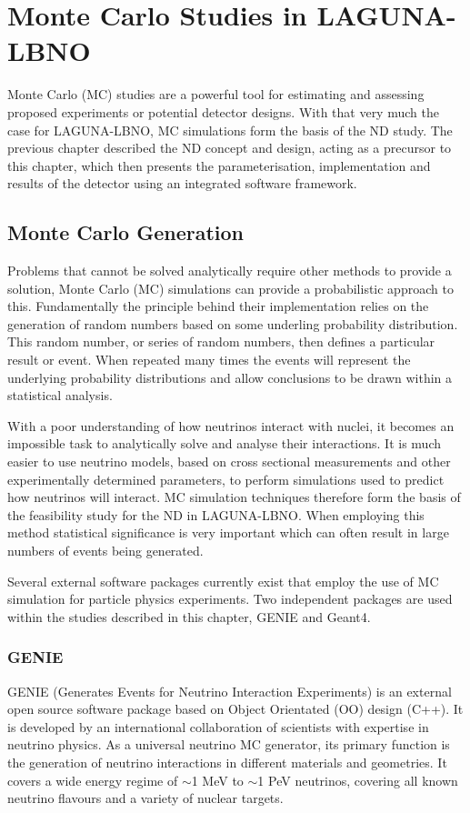 \chapter{Monte Carlo Studies in LAGUNA-LBNO}
Monte Carlo (MC) studies are a powerful tool for estimating and assessing proposed experiments or potential detector designs. With that very much the case for LAGUNA-LBNO, MC simulations form the basis of the ND study. The previous chapter described the ND concept and design, acting as a precursor to this chapter, which then presents the parameterisation, implementation and results of the detector using an integrated software framework.

\section{Monte Carlo Generation}
Problems that cannot be solved analytically require other methods to provide a solution, Monte Carlo (MC) simulations can provide a probabilistic approach to this. Fundamentally the principle behind their implementation relies on the generation of random numbers based on some underling probability distribution. This random number, or series of random numbers, then defines a particular result or event. When repeated many times the events will represent the underlying probability distributions and allow conclusions to be drawn within a statistical analysis. 

With a poor understanding of how neutrinos interact with nuclei, it becomes an impossible task to analytically solve and analyse their interactions. It is much easier to use neutrino models, based on cross sectional measurements and other experimentally determined parameters, to perform simulations used to predict how neutrinos will interact. MC simulation techniques therefore form the basis of the feasibility study for the ND in LAGUNA-LBNO. When employing this method statistical significance is very important which can often result in large numbers of events being generated.

Several external software packages currently exist that employ the use of MC simulation for particle physics experiments. Two independent packages are used within the studies described in this chapter, GENIE\cite{GENIE} and Geant4\cite{GEANT}.  

\subsection{GENIE}
GENIE (Generates Events for Neutrino Interaction Experiments) \cite{GENIE} is an external open source software package based on Object Orientated (OO) design (C++). It is developed by an international collaboration of scientists with expertise in neutrino physics. As a universal neutrino MC generator, its primary function is the generation of neutrino interactions in different materials and geometries. It covers a wide energy regime of $\sim$1 MeV to $\sim$1 PeV neutrinos, covering all known neutrino flavours and a variety of nuclear targets.

